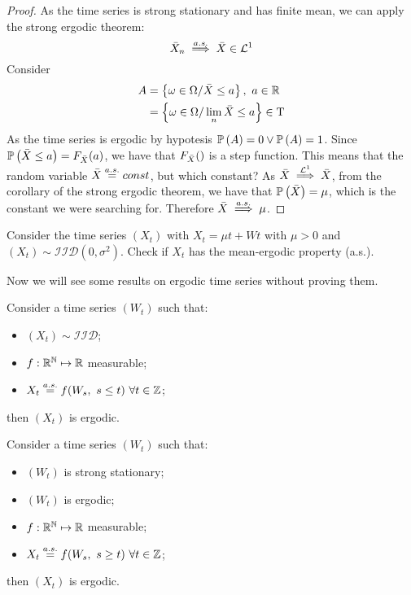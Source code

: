 \begin{proof}
    As the time series is strong stationary and has finite mean, we can apply the strong ergodic theorem:
    \[
        \bar{X}_n\stackrel{a.s.}{\implies}\bar{X}\in\mathcal{L}^{1}  
    \]
    Consider
    \begin{equation*}
        \begin{split}
            A&=\left\{\omega\in\Omega/\bar{X}\le a\right\},\ a\in\mathbb{R}\\
            &=\left\{\omega\in\Omega/\lim_n\bar{X}\le a\right\}\in\mathrm{T}\\
        \end{split}
    \end{equation*}
    As the time series is ergodic by hypotesis $\mathbb{P}\left(A\right)=0\vee\mathbb{P}\left(A\right)=1$. Since $\mathbb{P}\left(\bar{X}\le a\right)=F_{\bar{X}}(a)$, we have that $F_{\bar{X}}()$ is a step function. This means that the random variable $\bar{X}\stackrel{a.s.}{=} const$, but which constant? As $\bar{X}\stackrel{\mathcal{L}^{1}}{\implies}\bar{X}$, from the corollary of the strong ergodic theorem, we have that $\mathbb{P}\left(\bar{X}\right)=\mu$, which is the constant we were searching for. Therefore $\bar{X}\stackrel{a.s.}{\implies}\mu$.
\end{proof}

\begin{exercise}
    Consider the time series $(X_t)$ with $X_t=\mu t+Wt$ with $\mu>0$ and $(X_t)\sim\mathcal{IID}(0,\sigma^2)$. Check if $X_t$ has the mean-ergodic property (a.s.).
\end{exercise}

Now we will see some results on ergodic time series without proving them.

\begin{theorem}
    Consider a time series $(W_t)$ such that:
    \begin{itemize}
        \item $(X_t)\sim\mathcal{IID}$;
        \item $f:\mathbb{R}^{\mathbb{N}}\mapsto\mathbb{R}$ measurable;
        \item $X_t\stackrel{a.s.}{=} f(W_s,\ s\le t)\ \forall t\in\mathbb{Z}$;
    \end{itemize}
    then $(X_t)$ is ergodic.
\end{theorem}

\begin{theorem}
    Consider a time series $(W_t)$ such that:
    \begin{itemize}
        \item $(W_t)$ is strong stationary;
        \item $(W_t)$ is ergodic;
        \item $f:\mathbb{R}^{\mathbb{N}}\mapsto\mathbb{R}$ measurable;
        \item $X_t\stackrel{a.s.}{=} f(W_s,\ s\ge t)\ \forall t\in\mathbb{Z}$;
    \end{itemize}
    then $(X_t)$ is ergodic.
\end{theorem}

